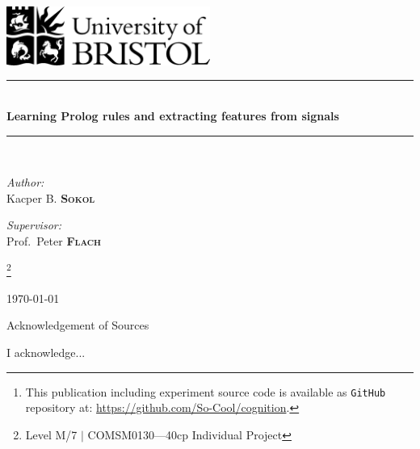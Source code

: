 \documentclass[12pt, a4paper, pdflatex, leqno, twoside]{report}
\newcommand{\HRule}{\rule{\linewidth}{0.5mm}}
\begin{document}
\begin{titlepage}
  \begin{center}
\includegraphics[width=0.5\textwidth]{gfx/UOB-logo.png}~\\[2.5cm]

\HRule \\[0.4cm]
{\huge \bfseries
  Learning Prolog rules and extracting features from signals\\[0.4cm]
}
\HRule \\[1.5cm]

    \begin{minipage}{0.4\textwidth}
      \begin{flushleft} \large
\emph{Author:}\\
Kacper B. \textsc{\textbf{Sokol}}
      \end{flushleft}
    \end{minipage}
    \begin{minipage}{0.4\textwidth}
      \begin{flushright} \large
\emph{Supervisor:} \\
Prof.\ Peter \textsc{\textbf{Flach}}
      \end{flushright}
    \end{minipage}

\let\thefootnote\relax\footnote{Level M/7 $|$ COMSM0130---40cp Individual Project}

\vfill %
{\large \today}
  \end{center}
\end{titlepage}

\newpage
\thispagestyle{empty}
\mbox{}

\newpage
\thispagestyle{empty}
\mbox{}

\begin{center}Acknowledgement of Sources\\[2cm]\end{center}
I acknowledge...

\newpage
\thispagestyle{empty}
\mbox{}

\begin{abstract}
\thispagestyle{empty}
The abstract is...
\begin{center}
Keywords: \textbf{keywords...}

\let\thefootnote\relax\footnote{\noindent This publication including experiment source code is available as \texttt{GitHub} repository at: \url{https://github.com/So-Cool/cognition}.}
\end{center}
\end{abstract}
\end{document}
